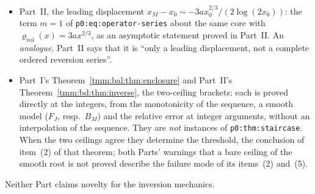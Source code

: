 \documentclass[11pt,letterpaper]{article}
\theoremstyle{remark}\newtheorem{remark}[theorem]{Remark}
\newcommand{\file}[1]{\nolinkurl{#1}}
\newcommand{\vol}{\mathrm{vol}}
\begin{document}
\begin{itemize}
\item Part~II, the leading displacement $x_M-x_0\sim-3ax_0^{2/3}/(2\log(2x_0))$: the term $m=1$ of \file{p0:eq:operator-series} about the same core with $\varrho_\vol(x)=3ax^{2/3}$, as an asymptotic statement proved in Part~II. An \emph{analogue}. Part~II says that it is ``only a leading displacement, not a complete ordered reversion series''.
\item Part~I's Theorem~\ref{tmm:bal:thm:enclosure} and Part~II's Theorem~\ref{tmm:bd:thm:inverse}, the two-ceiling brackets: each is proved directly at the integers, from the monotonicity of the sequence, a smooth model ($F_J$, resp.\ $B_M$) and the relative error at integer arguments, without an interpolation of the sequence. They are \emph{not} instances of \file{p0:thm:staircase}. When the two ceilings agree they determine the threshold, the conclusion of item~(2) of that theorem; both Parts' warnings that a bare ceiling of the smooth root is not proved describe the failure mode of its items~(2) and~(5).
\end{itemize}
Neither Part claims novelty for the inversion mechanics.
\end{document}
